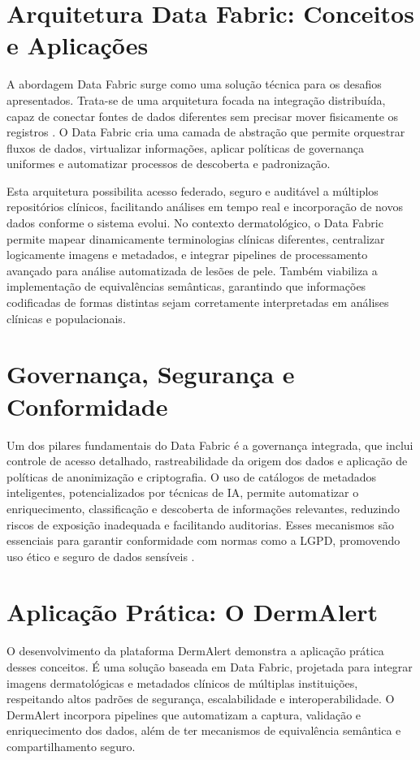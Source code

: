 \section{Arquitetura Data Fabric: Conceitos e Aplicações}

A abordagem Data Fabric surge como uma solução técnica para os desafios apresentados. Trata-se de uma arquitetura focada na integração distribuída, capaz de conectar fontes de dados diferentes sem precisar mover fisicamente os registros \cite{gartner2021data, sharma2023data}. O Data Fabric cria uma camada de abstração que permite orquestrar fluxos de dados, virtualizar informações, aplicar políticas de governança uniformes e automatizar processos de descoberta e padronização.

Esta arquitetura possibilita acesso federado, seguro e auditável a múltiplos repositórios clínicos, facilitando análises em tempo real e incorporação de novos dados conforme o sistema evolui. No contexto dermatológico, o Data Fabric permite mapear dinamicamente terminologias clínicas diferentes, centralizar logicamente imagens e metadados, e integrar pipelines de processamento avançado para análise automatizada de lesões de pele. Também viabiliza a implementação de equivalências semânticas, garantindo que informações codificadas de formas distintas sejam corretamente interpretadas em análises clínicas e populacionais.

\section{Governança, Segurança e Conformidade}

Um dos pilares fundamentais do Data Fabric é a governança integrada, que inclui controle de acesso detalhado, rastreabilidade da origem dos dados e aplicação de políticas de anonimização e criptografia. O uso de catálogos de metadados inteligentes, potencializados por técnicas de IA, permite automatizar o enriquecimento, classificação e descoberta de informações relevantes, reduzindo riscos de exposição inadequada e facilitando auditorias. Esses mecanismos são essenciais para garantir conformidade com normas como a LGPD, promovendo uso ético e seguro de dados sensíveis \cite{benfeldt2020data}.

\section{Aplicação Prática: O DermAlert}

O desenvolvimento da plataforma DermAlert demonstra a aplicação prática desses conceitos. É uma solução baseada em Data Fabric, projetada para integrar imagens dermatológicas e metadados clínicos de múltiplas instituições, respeitando altos padrões de segurança, escalabilidade e interoperabilidade. O DermAlert incorpora pipelines que automatizam a captura, validação e enriquecimento dos dados, além de ter mecanismos de equivalência semântica e compartilhamento seguro.

